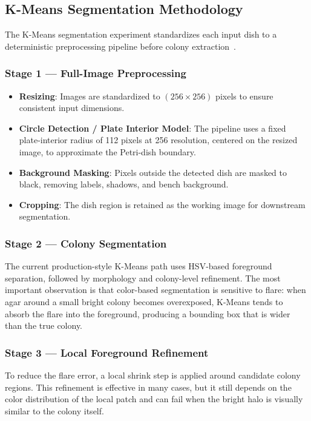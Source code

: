 \subsection{K-Means Segmentation Methodology}\label{kmeans-segmentation-methodology}

The K-Means segmentation experiment standardizes each input dish to a deterministic preprocessing pipeline before colony extraction~\cite{macqueen1967kmeans}.

\subsubsection{Stage 1 --- Full-Image Preprocessing}

\begin{itemize}
\item \textbf{Resizing}: Images are standardized to $(256 \times 256)$ pixels to ensure consistent input dimensions.
\item \textbf{Circle Detection / Plate Interior Model}: The pipeline uses a fixed plate-interior radius of 112 pixels at 256 resolution, centered on the resized image, to approximate the Petri-dish boundary.
\item \textbf{Background Masking}: Pixels outside the detected dish are masked to black, removing labels, shadows, and bench background.
\item \textbf{Cropping}: The dish region is retained as the working image for downstream segmentation.
\end{itemize}

\subsubsection{Stage 2 --- Colony Segmentation}

The current production-style K-Means path uses HSV-based foreground separation, followed by morphology and colony-level refinement. The most important observation is that color-based segmentation is sensitive to flare: when agar around a small bright colony becomes overexposed, K-Means tends to absorb the flare into the foreground, producing a bounding box that is wider than the true colony.

\subsubsection{Stage 3 --- Local Foreground Refinement}

To reduce the flare error, a local shrink step is applied around candidate colony regions. This refinement is effective in many cases, but it still depends on the color distribution of the local patch and can fail when the bright halo is visually similar to the colony itself.

